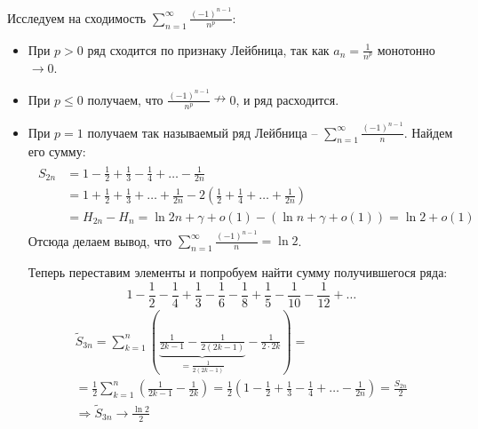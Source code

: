 \begin{example}
    Исследуем на сходимость $\sum\limits_{n=1}^\infty \frac{(-1)^{n-1}}{n^p}$:
    \begin{itemize}
        \item При $p > 0$ ряд сходится по признаку Лейбница, так как $a_n = \frac{1}{n^p}$ монотонно $\to 0$.
        \item При $p \leqslant 0$ получаем, что $\frac{(-1)^{n-1}}{n^p} \nrightarrow 0$, и ряд расходится.
        \item При $p = 1$ получаем так называемый ряд Лейбница -- $\sum\limits_{n = 1}^\infty \frac{(-1)^{n-1}}{n}$. Найдем его сумму:
        \begin{gather*}
            \begin{split}
                S_{2n} &= 1 - \frac{1}{2} + \frac{1}{3} - \frac{1}{4} + \dots - \frac{1}{2n} \\
                &= 1 + \frac{1}{2} + \frac{1}{3} + \dots + \frac{1}{2n} - 2(\frac{1}{2} + \frac{1}{4} + \dots + \frac{1}{2n}) \\
                &= H_{2n} - H_n = \ln 2n + \gamma + o(1) - (\ln n + \gamma + o(1)) = \ln 2 + o(1)
            \end{split}
        \end{gather*}
        Отсюда делаем вывод, что $\sum\limits_{n = 1}^\infty \frac{(-1)^{n-1}}{n} = \ln 2$.
        
        Теперь переставим элементы и попробуем найти сумму получившегося ряда: \[ 1 - \frac{1}{2} - \frac{1}{4} + \frac{1}{3} - \frac{1}{6} - \frac{1}{8} + \frac{1}{5} - \frac{1}{10} - \frac{1}{12} + \dots \]
        \begin{gather*}
            \widetilde{S}_{3n} = \sum_{k = 1}^n \left(\underbrace{\frac{1}{2k - 1} - \frac{1}{2(2k - 1)}}_{= \frac{1}{2(2k - 1)}} - \frac{1}{2 \cdot 2k}\right) = \\ 
            =  \frac{1}{2}\sum_{k = 1}^n \left(\frac{1}{2k - 1} - \frac{1}{2k}\right) = \frac{1}{2}\left(1 - \frac{1}{2} + \frac{1}{3} - \frac{1}{4} + \dots - \frac{1}{2n}\right) = \frac{S_{2n}}{2} \\
            \Rightarrow \widetilde{S}_{3n} \to \frac{\ln 2}{2}
        \end{gather*}
        
    \end{itemize}
\end{example}